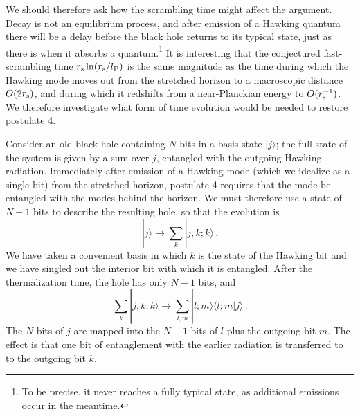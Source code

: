 \documentclass[12pt]{article}
\begin{document}
We should therefore ask how the scrambling time might affect the argument.  Decay is not an equilibrium process, and after emission of a Hawking quantum there will be a delay before the black hole returns to its typical state, just as there is when it absorbs a quantum.\footnote{To be precise, it never reaches a fully typical state, as additional emissions occur in the meantime.}  It is interesting that the conjectured fast-scrambling time $r_{\rm s} \ln (r_{\rm s}/l_{\rm P})$ is the same magnitude as the time during which the Hawking mode moves out from the stretched horizon to a macroscopic distance $O(2 r_{\rm s})$, and during which it redshifts from a near-Planckian energy to $O(r_{\rm s}^{-1})$.  We therefore investigate what form of time evolution would be needed to restore postulate 4.

Consider an old black hole containing $N$ bits in a basis state $|j\rangle$; the full state of the system is given by a sum over $j$, entangled with the outgoing Hawking radiation.  Immediately after emission of a Hawking mode (which we idealize as a single bit) from the stretched horizon, postulate 4 requires that the mode be entangled with the modes behind the horizon.  We must therefore use a state of $N+1$ bits to describe the resulting hole, so that the evolution is
\begin{equation}
\label{vacuum}
|j\rangle \to \sum_k |j , k ; k\rangle \,.
\end{equation}
We have taken a convenient basis in which $k$ is the state of the Hawking bit and we have singled out the interior bit with which it is entangled.  After the thermalization time, the hole has only $N-1$ bits, and
\begin{equation}
\sum_k |j , k ; k\rangle \to \sum_{l,m} |l; m\rangle \langle l;m|j\rangle \,. \label{therm}
\end{equation}
The $N$ bits of $j$ are mapped into the $N-1$ bits of $l$ plus the outgoing bit $m$.
The effect is that one bit of entanglement with the earlier radiation is transferred to to the outgoing bit $k$.
\end{document}
